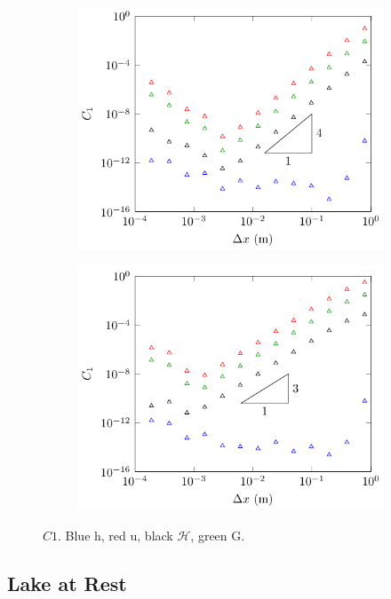 \begin{figure}
\begin{subfigure}{0.5\textwidth}
		\includegraphics[width=\textwidth]{./chp5/figures/Analytic/Soliton/C1/D.pdf}
	\end{subfigure}%
	\begin{subfigure}{0.5\textwidth}
		\includegraphics[width=\textwidth]{./chp5/figures/Analytic/Soliton/C1/W.pdf}
	\end{subfigure}
	\caption{$C1$. Blue h, red u, black $\mathcal{H}$, green G.}
	\label{fig:SolitonC1All}
\end{figure}

\subsection{Lake at Rest}

